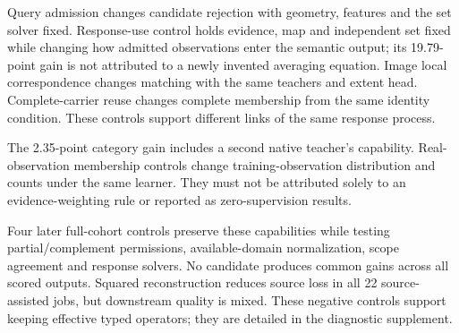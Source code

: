 \begin{table}[ht]
\centering\small
\resizebox{\linewidth}{!}{}
\caption{Our matched identity, response-use and image-extent controls.
First two rows use LERF selected projection and semantic IoU respectively;
last two use actual UQIS image instance IoU. Different controls are non-additive.}
\label{tab:core-components}
\end{table}
Query admission changes candidate rejection with geometry, features and the set
solver fixed. Response-use control holds evidence, map and independent set
fixed while changing how admitted observations enter the semantic output; its
19.79-point gain is not attributed to a newly invented averaging equation.
Image local correspondence changes matching with the same teachers and extent
head. Complete-carrier reuse changes complete membership from the same identity
condition. These controls support different links of the same response process.

\begin{table}[ht]
\centering\small
\resizebox{\linewidth}{!}{}
\caption{Additional in-house component controls. Dual-native fusion uses three
held-out ScanNet rooms; point rows use UQIS actual-set IoU. Point supervision
changes observation distribution and sample counts, not only a formula.}
\label{tab:extent-components}
\end{table}
The 2.35-point category gain includes a second native teacher's capability.
Real-observation membership controls change training-observation distribution
and counts under the same learner. They must not be attributed solely to an
evidence-weighting rule or reported as zero-supervision results.

Four later full-cohort controls preserve these capabilities while testing
partial/complement permissions, available-domain normalization, scope agreement
and response solvers. No candidate produces common gains across all scored
outputs. Squared reconstruction reduces source loss in all 22 source-assisted
jobs, but downstream quality is mixed. These negative controls support keeping
effective typed operators; they are detailed in the diagnostic supplement.



